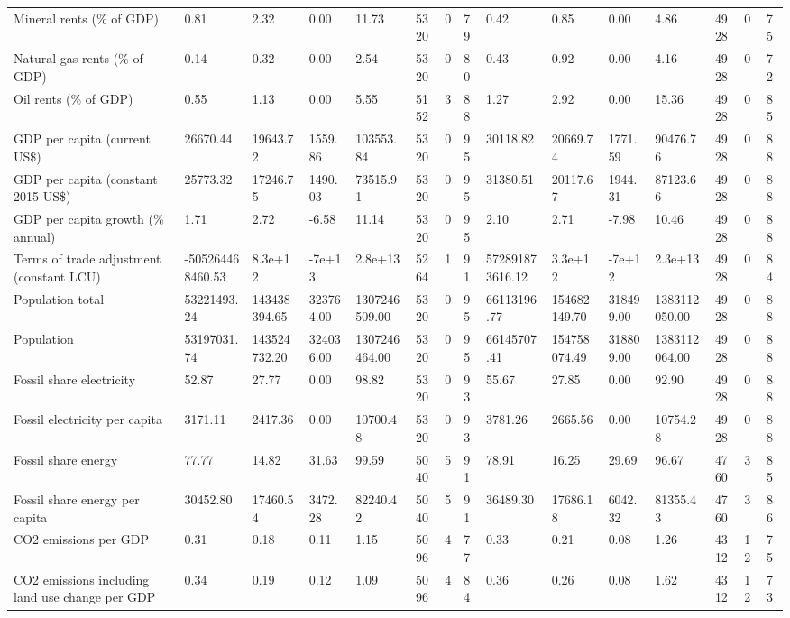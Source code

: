 \begin{longtable}{lllllllllllllll}
\addlinespace
Mineral rents (\% of GDP) & 0.81 & 2.32 & 0.00 & 11.73 & 5320 & 0 & 79 & 0.42 & 0.85 & 0.00 & 4.86 & 4928 & 0 & 75\\
Natural gas rents (\% of GDP) & 0.14 & 0.32 & 0.00 & 2.54 & 5320 & 0 & 80 & 0.43 & 0.92 & 0.00 & 4.16 & 4928 & 0 & 72\\
Oil rents (\% of GDP) & 0.55 & 1.13 & 0.00 & 5.55 & 5152 & 3 & 88 & 1.27 & 2.92 & 0.00 & 15.36 & 4928 & 0 & 85\\
GDP per capita (current US\$) & 26670.44 & 19643.72 & 1559.86 & 103553.84 & 5320 & 0 & 95 & 30118.82 & 20669.74 & 1771.59 & 90476.76 & 4928 & 0 & 88\\
GDP per capita (constant 2015 US\$) & 25773.32 & 17246.75 & 1490.03 & 73515.91 & 5320 & 0 & 95 & 31380.51 & 20117.67 & 1944.31 & 87123.66 & 4928 & 0 & 88\\
\addlinespace
GDP per capita growth (\% annual) & 1.71 & 2.72 & -6.58 & 11.14 & 5320 & 0 & 95 & 2.10 & 2.71 & -7.98 & 10.46 & 4928 & 0 & 88\\
Terms of trade adjustment (constant LCU) & -505264468460.53 & 8.3e+12 & -7e+13 & 2.8e+13 & 5264 & 1 & 91 & 572891873616.12 & 3.3e+12 & -7e+12 & 2.3e+13 & 4928 & 0 & 84\\
Population total & 53221493.24 & 143438394.65 & 323764.00 & 1307246509.00 & 5320 & 0 & 95 & 66113196.77 & 154682149.70 & 318499.00 & 1383112050.00 & 4928 & 0 & 88\\
Population & 53197031.74 & 143524732.20 & 324036.00 & 1307246464.00 & 5320 & 0 & 95 & 66145707.41 & 154758074.49 & 318809.00 & 1383112064.00 & 4928 & 0 & 88\\
Fossil share electricity & 52.87 & 27.77 & 0.00 & 98.82 & 5320 & 0 & 93 & 55.67 & 27.85 & 0.00 & 92.90 & 4928 & 0 & 88\\
\addlinespace
Fossil electricity per capita & 3171.11 & 2417.36 & 0.00 & 10700.48 & 5320 & 0 & 93 & 3781.26 & 2665.56 & 0.00 & 10754.28 & 4928 & 0 & 88\\
Fossil share energy & 77.77 & 14.82 & 31.63 & 99.59 & 5040 & 5 & 91 & 78.91 & 16.25 & 29.69 & 96.67 & 4760 & 3 & 85\\
Fossil share energy per capita & 30452.80 & 17460.54 & 3472.28 & 82240.42 & 5040 & 5 & 91 & 36489.30 & 17686.18 & 6042.32 & 81355.43 & 4760 & 3 & 86\\
CO2 emissions per GDP & 0.31 & 0.18 & 0.11 & 1.15 & 5096 & 4 & 77 & 0.33 & 0.21 & 0.08 & 1.26 & 4312 & 12 & 75\\
CO2 emissions including land use change per GDP & 0.34 & 0.19 & 0.12 & 1.09 & 5096 & 4 & 84 & 0.36 & 0.26 & 0.08 & 1.62 & 4312 & 12 & 73\\

\end{longtable}
